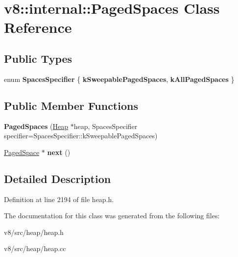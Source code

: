 \hypertarget{classv8_1_1internal_1_1PagedSpaces}{}\section{v8\+:\+:internal\+:\+:Paged\+Spaces Class Reference}
\label{classv8_1_1internal_1_1PagedSpaces}
\subsection*{Public Types}
\begin{DoxyCompactItemize}
\item 
\mbox{\label{classv8_1_1internal_1_1PagedSpaces_a897c42815d488110e5a6dcfab34864d7}} 
enum {\bfseries Spaces\+Specifier} \{ {\bfseries k\+Sweepable\+Paged\+Spaces}, 
{\bfseries k\+All\+Paged\+Spaces}
 \}
\end{DoxyCompactItemize}
\subsection*{Public Member Functions}
\begin{DoxyCompactItemize}
\item 
\mbox{\label{classv8_1_1internal_1_1PagedSpaces_a68091885445ac8d2b0b855cc175906ac}} 
{\bfseries Paged\+Spaces} (\mbox{\hyperlink{classv8_1_1internal_1_1Heap}{Heap}} $\ast$heap, Spaces\+Specifier specifier=Spaces\+Specifier\+::k\+Sweepable\+Paged\+Spaces)
\item 
\mbox{\label{classv8_1_1internal_1_1PagedSpaces_aae442f58d107ad413f7fc491b6a58363}} 
\mbox{\hyperlink{classv8_1_1internal_1_1PagedSpace}{Paged\+Space}} $\ast$ {\bfseries next} ()
\end{DoxyCompactItemize}


\subsection{Detailed Description}


Definition at line 2194 of file heap.\+h.



The documentation for this class was generated from the following files\+:\begin{DoxyCompactItemize}
\item 
v8/src/heap/heap.\+h\item 
v8/src/heap/heap.\+cc\end{DoxyCompactItemize}

